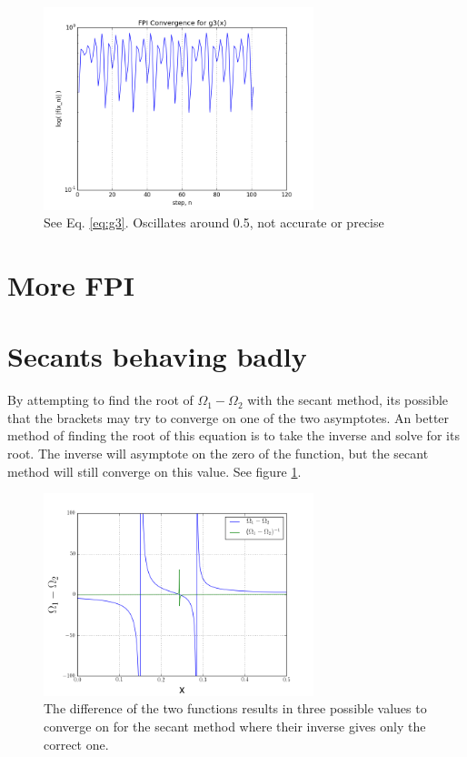 \documentclass[12pt]{article}
\begin{document}
  \begin{figure}[h]
    \centering
    \includegraphics[width=0.7\textwidth]{Problem4dc.png}
    \caption{See Eq. \ref{eq:g3}. Oscillates around 0.5, not accurate or precise}
  \end{figure}

  \clearpage

  \section{More FPI}

  \clearpage

  \section{Secants behaving badly}

  By attempting to find the root of $\Omega_1 - \Omega_2$ with the secant method,
  its possible that the brackets may try to converge on one of the two
  asymptotes.
  An better method of finding the root of this equation is to take the inverse
  and solve for its root. The inverse will asymptote on the zero of the 
  function, but the secant method will still converge on this value.
  See figure \ref{fig:omega}.

  \begin{figure}[h]
    \label{fig:omega}
    \centering
    \includegraphics[width=0.7\textwidth]{Problem6a.png}
    \caption{The difference of the two functions results in three possible
    values to converge on for the secant method where their inverse gives
    only the correct one.}
  \end{figure}
  
\end{document}
